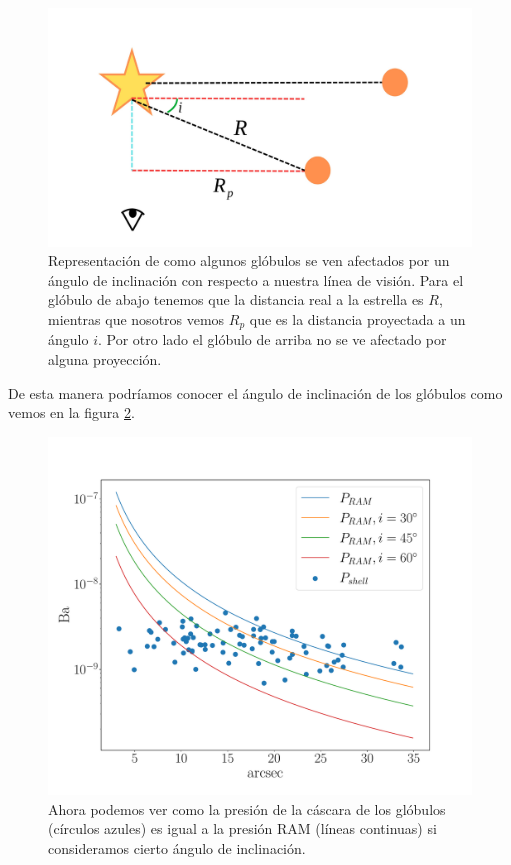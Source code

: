\documentclass{book}
\begin{document}
\begin{figure}[htb]
    \centering
    \includegraphics[width=\textwidth]{artesanales/ImgFi01-6.pdf}
    \caption{Representación de como algunos glóbulos se ven afectados por un ángulo de inclinación con respecto a nuestra línea de visión. Para el glóbulo de abajo tenemos que la distancia real a la estrella es $R$, mientras que nosotros vemos $R_p$ que es la distancia proyectada a un ángulo $i$. Por otro lado el glóbulo de arriba no se ve afectado por alguna proyección.}
    \label{Ang proyeccion}
\end{figure}

De esta manera podríamos conocer el ángulo de inclinación de los glóbulos como vemos en la figura \ref{graf_presion_ang}.

\begin{figure}[htb]
    \centering
    \includegraphics[width=\textwidth]{imagenes Chapter 4/Presiones_ang.pdf}
    \caption{Ahora podemos ver como la presión de la cáscara de los glóbulos (círculos azules) es igual a la presión RAM (líneas continuas) si consideramos cierto ángulo de inclinación.}
    \label{graf_presion_ang}
\end{figure}
\end{document}
